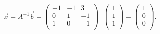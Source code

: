 \[ 
\Vec{x} = A^{-1} \Vec{b} = \begin{pmatrix}-1 & -1 & 3\\0 & 1 & -1\\1 & 0 & -1\\\end{pmatrix} \cdot \begin{pmatrix}1\\1\\1\\\end{pmatrix} = \left(\begin{array}{c} 1 \\ 0 \\ 0 \\\end{array}\right)
.\]




